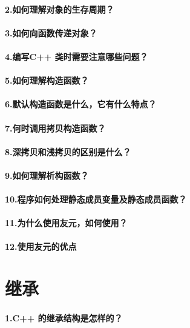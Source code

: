 \documentclass[UTF8,a4paper,8pt]{ctexart}
\begin{document}
	 \paragraph{2.如何理解对象的生存周期？}
	 \paragraph{3.如何向函数传递对象？}
	 \paragraph{4.编写C++ 类时需要注意哪些问题？}
	 \paragraph{5.如何理解构造函数？}
	 \paragraph{6.默认构造函数是什么，它有什么特点？}
	 \paragraph{7.何时调用拷贝构造函数？}
	 \paragraph{8.深拷贝和浅拷贝的区别是什么？}
	 \paragraph{9.如何理解析构函数？}
	 \paragraph{10.程序如何处理静态成员变量及静态成员函数？}
	 \paragraph{11.为什么使用友元，如何使用？}
	 \paragraph{12.使用友元的优点}  
	 
\section*{继承}
	 \paragraph{1.C++ 的继承结构是怎样的？}
\end{document}
